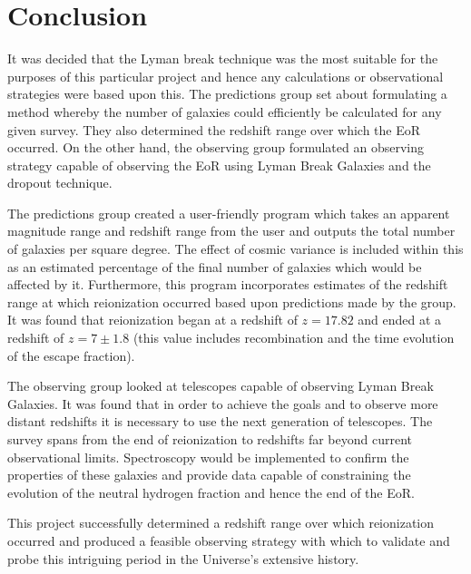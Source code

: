 \section{Conclusion} %
\label{sec:conclusion}
	It was decided that the Lyman break technique was the most suitable for the purposes of this particular project and hence any calculations or observational strategies were based upon this. The predictions group set about formulating a method whereby the number of galaxies could efficiently be calculated for any given survey. They also determined the redshift range over which the EoR occurred. On the other hand, the observing group formulated an observing strategy capable of observing the EoR using Lyman Break Galaxies and the dropout technique.

	The predictions group created a user-friendly program which takes an apparent magnitude range and redshift range from the user and outputs the total number of galaxies per square degree. The effect of cosmic variance is included within this as an estimated percentage of the final number of galaxies which would be affected by it. Furthermore, this program incorporates estimates of the redshift range at which reionization occurred based upon predictions made by the group. It was found that reionization began at a redshift of $z=17.82$ and ended at a redshift of $z=7\pm 1.8$ (this value includes recombination and the time evolution of the escape fraction).

	The observing group looked at telescopes capable of observing Lyman Break Galaxies. It was found that in order to achieve the goals and to observe more distant redshifts it is necessary to use the next generation of telescopes. The survey spans from the end of reionization to redshifts far beyond current observational limits. Spectroscopy would be implemented to confirm the properties of these galaxies and provide data capable of constraining the evolution of the neutral hydrogen fraction and hence the end of the EoR.

	This project successfully determined a redshift range over which reionization occurred and produced a feasible observing strategy with which to validate and probe this intriguing period in the Universe’s extensive history.


